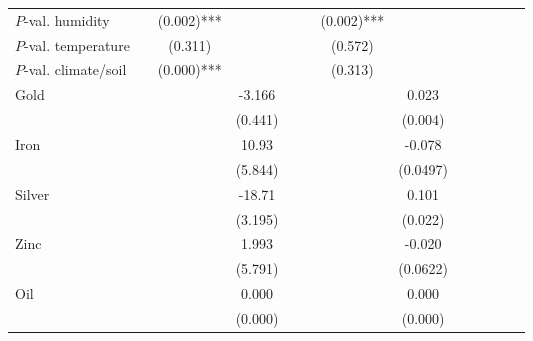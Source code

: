 \begin{sidewaystable}[h!]
\begin{threeparttable}
\begin{center}
\begin{minipage}{\textwidth}
\begin{tabular*}{\textwidth}{@{\extracolsep{\fill}}lcccccccccccc@{\extracolsep{\fill}}}
$P$-val. humidity &&(0.002)***&&&& (0.002)*** & \\
$P$-val. temperature &&(0.311)\;\;\;\;\; &&&& (0.572)\;\;\;\;\; & \\
$P$-val. climate/soil &&(0.000)***&&&& (0.313)\;\;\;\;\; & \\
[0.5em]
Gold       &                     &                     &      -3.166\sym{***}&                     &                     &                     &      0.023\sym{***}&                     \\
            &                     &                     &     (0.441)         &                     &                     &                     &   (0.004)         &                     \\
[0.5em]
Iron        &                     &                     &       10.93\sym{*}  &                     &                     &                     &     -0.078         &                     \\
            &                     &                     &     (5.844)         &                     &                     &                     &    (0.0497)         &                     \\
[0.5em]
Silver        &                     &                     &      -18.71\sym{***}&                     &                     &                     &       0.101\sym{***}&                     \\
            &                     &                     &     (3.195)         &                     &                     &                     &    (0.022)         &                     \\
[0.5em]
Zinc        &                     &                     &       1.993         &                     &                     &                     &     -0.020         &                     \\
            &                     &                     &     (5.791)         &                     &                     &                     &    (0.0622)         &                     \\
[0.5em]
Oil      &                     &                     &  0.000   &                     &                     &                     &0.000        &                     \\
            &                     &                     & (0.000)         &                     &                     &                     &(0.000)         &                     \\

\end{tabular*}
\end{minipage}
\end{center}
\end{threeparttable}
\end{sidewaystable}
